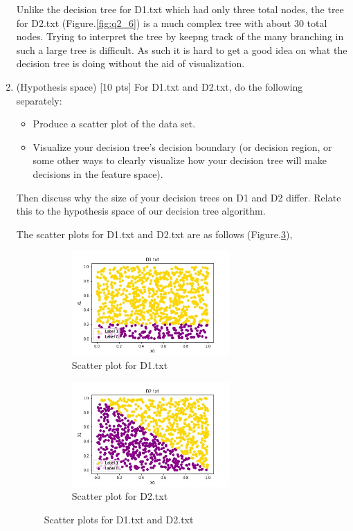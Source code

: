 \documentclass[a4paper]{article}
\theoremstyle{definition}
\newenvironment{soln}{
    \leavevmode\color{blue}\ignorespaces
}{}
\begin{document}
\begin{enumerate}
\begin{soln}
    Unlike the decision tree for D1.txt which had only three total nodes, the tree for D2.txt (Figure.\ref{fig:q2_6}) is a much complex tree with about 30 total nodes. Trying to interpret the tree by keepng track of the many branching in such a large tree is difficult. As such it is hard to get a good idea on what the decision tree is doing without the aid of visualization.
  \end{soln}

\item (Hypothesis space)  [10 pts] For D1.txt and D2.txt, do the following separately:
  \begin{itemize}
  
  \item Produce a scatter plot of the data set.

  \item Visualize your decision tree's decision boundary (or decision region, or some other ways to clearly visualize how your decision tree will make decisions in the feature space).

  \end{itemize}
Then discuss why the size of your decision trees on D1 and D2 differ.  Relate this to the hypothesis space of our decision tree algorithm. \\

\begin{soln}
  The scatter plots for D1.txt and D2.txt are as follows (Figure.\ref{fig:q2_7}),
    \begin{figure}[H]
      \centering
      \begin{subfigure}[b]{0.3\textwidth}
          \centering
          \includegraphics[width=6cm]{d1_scatter.jpg}
          \caption{Scatter plot for D1.txt}
          \label{fig:d1_scatter}
      \end{subfigure}
      \begin{subfigure}[b]{0.3\textwidth}
          \centering
          \includegraphics[width=6cm]{d2_scatter.jpg}
          \caption{Scatter plot for D2.txt}
          \label{fig:d2_scatter}
      \end{subfigure}
      \caption{Scatter plots for D1.txt and D2.txt}
      \label{fig:q2_7}
  \end{figure}



\end{soln}
\end{enumerate}
\end{document}
